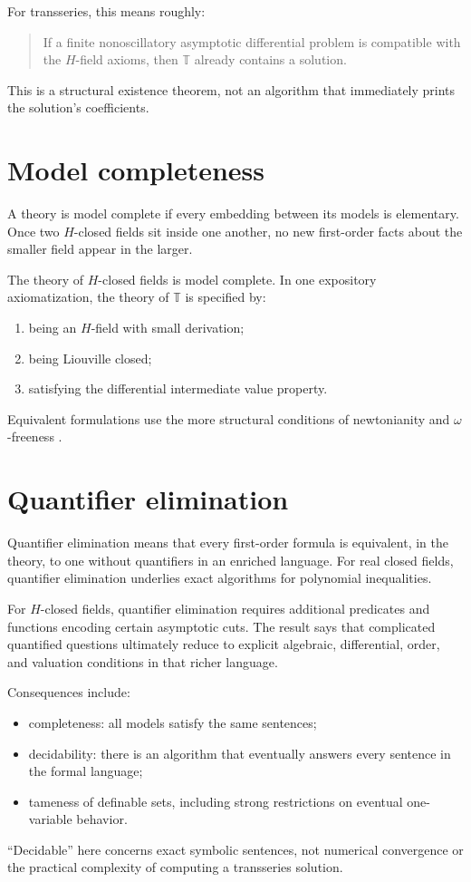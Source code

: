 \documentclass[11pt,openany]{book}
\theoremstyle{definition}
\theoremstyle{plain}
\theoremstyle{remark}
\newcommand{\T}{\mathbb{T}}
\begin{document}
For transseries, this means roughly:
\begin{quote}
If a finite nonoscillatory asymptotic differential problem is compatible with the $H$-field axioms, then $\T$ already contains a solution.
\end{quote}
This is a structural existence theorem, not an algorithm that immediately prints the solution's coefficients.

\section{Model completeness}

A theory is model complete if every embedding between its models is elementary. Once two $H$-closed fields sit inside one another, no new first-order facts about the smaller field appear in the larger.

The theory of $H$-closed fields is model complete. In one expository axiomatization, the theory of $\T$ is specified by:
\begin{enumerate}
 \item being an $H$-field with small derivation;
 \item being Liouville closed;
 \item satisfying the differential intermediate value property.
\end{enumerate}
Equivalent formulations use the more structural conditions of newtonianity and $\omega$-freeness \cite{adh-book,adh-numbers}.

\section{Quantifier elimination}

Quantifier elimination means that every first-order formula is equivalent, in the theory, to one without quantifiers in an enriched language. For real closed fields, quantifier elimination underlies exact algorithms for polynomial inequalities.

For $H$-closed fields, quantifier elimination requires additional predicates and functions encoding certain asymptotic cuts. The result says that complicated quantified questions ultimately reduce to explicit algebraic, differential, order, and valuation conditions in that richer language.

Consequences include:
\begin{itemize}
 \item completeness: all models satisfy the same sentences;
 \item decidability: there is an algorithm that eventually answers every sentence in the formal language;
 \item tameness of definable sets, including strong restrictions on eventual one-variable behavior.
\end{itemize}
``Decidable'' here concerns exact symbolic sentences, not numerical convergence or the practical complexity of computing a transseries solution.
\end{document}
